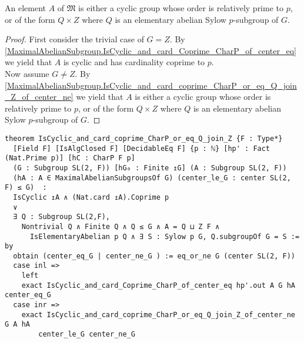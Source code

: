 \begin{theorem}
\label{MaximalAbelianSubgroup.IsCyclic_and_card_coprime_CharP_or_eq_Q_join_Z}
\leanok
An element $A$ of $\mathfrak{M}$ is either a cyclic group whose order is relatively prime to $p$, or of the form $Q \times Z$ where $Q$ is an elementary abelian Sylow $p$-subgroup of $G$. \vspace{3mm}
\end{theorem}
\begin{proof}
\leanok
  First consider the trivial case of $G=Z$.
  By \ref{MaximalAbelianSubgroup.IsCyclic_and_card_Coprime_CharP_of_center_eq} we yield that $A$ is cyclic and has cardinality coprime to $p$.
  \\
  Now assume $G \neq Z$.
  By \ref{MaximalAbelianSubgroup.IsCyclic_and_card_coprime_CharP_or_eq_Q_join_Z_of_center_ne} we yield that $A$ is either a cyclic group whose order is relatively prime to $p$, or of the form $Q \times Z$ where $Q$ is an elementary abelian Sylow $p$-subgroup of $G$.
\end{proof}
\begin{footnotesize}
\begin{verbatim}
theorem IsCyclic_and_card_coprime_CharP_or_eq_Q_join_Z {F : Type*}
  [Field F] [IsAlgClosed F] [DecidableEq F] {p : ℕ} [hp' : Fact (Nat.Prime p)] [hC : CharP F p]
  (G : Subgroup SL(2, F)) [hG₀ : Finite ↥G] (A : Subgroup SL(2, F))
  (hA : A ∈ MaximalAbelianSubgroupsOf G) (center_le_G : center SL(2, F) ≤ G)  :
  IsCyclic ↥A ∧ (Nat.card ↥A).Coprime p
  ∨
  ∃ Q : Subgroup SL(2,F),
    Nontrivial Q ∧ Finite Q ∧ Q ≤ G ∧ A = Q ⊔ Z F ∧
      IsElementaryAbelian p Q ∧ ∃ S : Sylow p G, Q.subgroupOf G = S := by
  obtain (center_eq_G | center_ne_G ) := eq_or_ne G (center SL(2, F))
  case inl =>
    left
    exact IsCyclic_and_card_Coprime_CharP_of_center_eq hp'.out A G hA center_eq_G
  case inr =>
    exact IsCyclic_and_card_coprime_CharP_or_eq_Q_join_Z_of_center_ne G A hA
        center_le_G center_ne_G
\end{verbatim}
\end{footnotesize}


